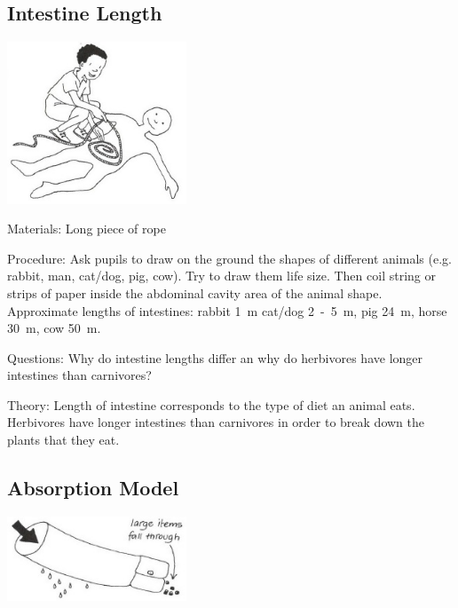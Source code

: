 \begin{multicols}{2}
\subsection{Intestine Length} %

\begin{center}
\includegraphics[width=0.4\textwidth]{./img/vso/intestine-length.jpg}
\end{center}

\begin{description*}
\item[Materials:]{Long piece of rope}
\item[Procedure:]{Ask pupils to draw on the ground the shapes of different animals (e.g. rabbit, man, cat/dog,
pig, cow). Try to draw them life size. Then coil string or strips of paper inside the abdominal
cavity area of the animal shape. Approximate lengths of intestines: rabbit 1~m
cat/dog 2~-~5~m, pig 24~m, horse 30~m, cow 50~m.}
\item[Questions:]{Why do intestine lengths differ an why do herbivores have longer intestines than carnivores?}
\item[Theory:]{Length of intestine corresponds to the type of diet an animal eats. Herbivores have longer
intestines than carnivores in order to break down the plants that they eat.}
\end{description*}

\subsection{Absorption Model} %

\begin{center}
\includegraphics[width=0.4\textwidth]{./img/vso/absorption-model.jpg}
\end{center}


\end{multicols}
